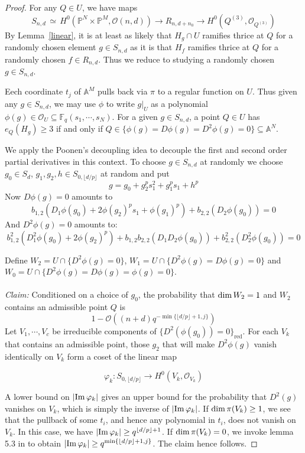 \documentclass[12pt]{article}
\theoremstyle{plain}
\theoremstyle{definition}
\newcommand{\IA}{\mathbb{A}}
\newcommand{\IF}{\mathbb{F}}
\newcommand{\IP}{\mathbb{P}}
\newcommand{\sO}{\mathcal{O}}
\renewcommand\dim{{\rm dim\,}}
\newcommand{\im}{{\rm Im\,}}
\newcommand\iso{{\, \simeq \,}}
\newcommand{\<}{\langle}
\renewcommand{\>}{\rangle}
\begin{document}
\begin{proof}
For any $Q \in U$, we have maps
$$ S_{n, d} \iso H^0(\IP^N \times \IP^M, \sO(n, d)) \to R_{n, d + n_0} \to H^0(Q^{(3)}, \sO_{Q^{(3)}}) $$ 
By Lemma~\ref{linear}, it is at least as likely that $H_g \cap U$ ramifies thrice at $Q$ for a randomly chosen element $g \in S_{n, d}$ as it is that $H_f$ ramifies thrice at $Q$ for a randomly chosen $f \in R_{n, d}$. Thus we reduce to studying a randomly chosen $g \in S_{n, d}$. 

Eech coordinate $t_j$ of $\IA^M$ pulls back via $\pi$ to a regular function on $U$. Thus given any $g \in S_{n, d}$, we may use $\phi$ to write $g|_U$ as a polynomial $\phi(g) \in \sO_U \subseteq \IF_q(s_1, \cdots, s_N)$. For a given $g \in S_{n, d}$, a point $Q \in U$ has $e_Q(H_g) \ge 3$ if and only if $Q \in \{ \phi(g) = D \phi(g) = D^2 \phi(g) = 0 \} \subseteq \IA^N$. 

We apply the Poonen's decoupling idea to decouple the first and second order partial derivatives in this context. To choose $g \in S_{n, d}$ at randomly we choose $g_0 \in S_d$, $g_1, g_2, h \in S_{0, \lfloor d/p \rfloor} $ at random and put 
$$ g = g_0 + g_{2}^p s_1^2 + g^p_{1} s_1 + h^p $$
Now $D \phi(g) = 0$ amounts to 
$$b_{1, 2} ( D_1 \phi(g_0) + 2 \phi(g_{2})^p s_1 + \phi(g_{1})^p) + b_{2, 2}(D_2 \phi(g_0)) = 0 $$
And $D^2 \phi(g) = 0$ amounts to: 
$$ b_{1, 2}^2 (D_1^2 \phi(g_0) + 2 \phi(g_{2})^p) + b_{1, 2}b_{2, 2} (D_1 D_2 \phi(g_0)) + b_{2, 2}^2(D_2^2 \phi(g_0)) = 0 $$


Define $W_2 = U \cap \{ D^2 \phi(g) = 0 \}$, $W_1 = U \cap \{D^2 \phi(g) = D \phi(g) = 0\}$ and $W_0 = U \cap \{ D^2 \phi(g) = D \phi(g) = \phi(g) = 0\}$. \\\\
\textit{Claim: }Conditioned on a choice of $g_0$, the probability that $\dim W_2 = 1$ and $W_2$ contains an admissible point $Q$ is $$1 - \sO((n + d)q^{- \min\{ \lfloor d/p \rfloor + 1, j\}})$$ Let $V_1, \cdots, V_c$ be irreducible components of $\{D^2(\phi(g_0)) = 0\}_{\mathrm{red}}$.    
For each $V_k$ that contains an admissible point, those $g_2$ that will make $D^2 \phi(g)$ vanish identically on $V_k$ form a coset of the linear map 

$$ \varphi_k : S_{0, \lfloor d/p \rfloor} \to H^0(V_k, \sO_{V_k})$$ 

A lower bound on $|\im \varphi_k|$ gives an upper bound for the probability that $D^2(g)$ vanishes on $V_k$, which is simply the inverse of $|\im \varphi_k|$. If $\dim \pi(V_k) \ge 1$, we see that the pullback of some $t_i$, and hence any polynomial in $t_i$, does not vanish on $V_k$. In this case, we have $|\im \varphi_k| \ge q^{\lfloor d/p \rfloor + 1}$. If $\dim \pi(V_k) = 0$, we invoke lemma 5.3 in \cite{Wood} to obtain $|\im \varphi_k| \ge q^{\min \{\lfloor d/p \rfloor + 1, j \}  }$. The claim hence follows. 


\end{proof}
\end{document}

